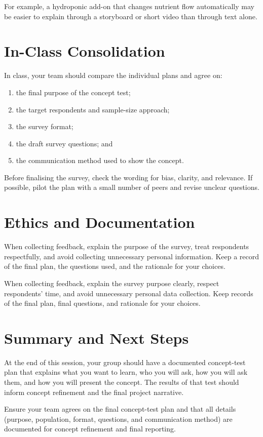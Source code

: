 For example, a hydroponic add-on that changes nutrient flow automatically may be easier to explain through a storyboard or short video than through text alone.

\section{In-Class Consolidation}

In class, your team should compare the individual plans and agree on:
\begin{enumerate}
    \item the final purpose of the concept test;
    \item the target respondents and sample-size approach;
    \item the survey format;
    \item the draft survey questions; and
    \item the communication method used to show the concept.
\end{enumerate}

Before finalising the survey, check the wording for bias, clarity, and relevance. If possible, pilot the plan with a small number of peers and revise unclear questions.

\section{Ethics and Documentation}

When collecting feedback, explain the purpose of the survey, treat respondents respectfully, and avoid collecting unnecessary personal information. Keep a record of the final plan, the questions used, and the rationale for your choices.

\begin{tcolorbox}[title=Hint]
When collecting feedback, explain the survey purpose clearly, respect respondents' time, and avoid unnecessary personal data collection. Keep records of the final plan, final questions, and rationale for your choices.
\end{tcolorbox}

\section{Summary and Next Steps}

At the end of this session, your group should have a documented concept-test plan that explains what you want to learn, who you will ask, how you will ask them, and how you will present the concept. The results of that test should inform concept refinement and the final project narrative.

\begin{tcolorbox}[title=Checkpoint]
Ensure your team agrees on the final concept-test plan and that all details (purpose, population, format, questions, and communication method) are documented for concept refinement and final reporting.
\end{tcolorbox}
